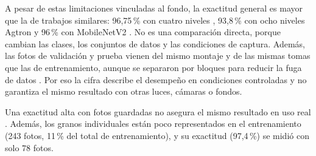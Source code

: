 A pesar de estas limitaciones vinculadas al fondo, la exactitud general es mayor que la de trabajos similares: 96,75\,\% con cuatro niveles \citep{marzuki2025}, 93,8\,\% con ocho niveles Agtron \citep{anto2025} y 96\,\% con MobileNetV2 \citep{arsyan2026}. No es una comparación directa, porque cambian las clases, los conjuntos de datos y las condiciones de captura. Además, las fotos de validación y prueba vienen del mismo montaje y de las mismas tomas que las de entrenamiento, aunque se separaron por bloques para reducir la fuga de datos \citep{kapoor2022}. Por eso la cifra describe el desempeño en condiciones controladas y no garantiza el mismo resultado con otras luces, cámaras o fondos.

Una exactitud alta con fotos guardadas no asegura el mismo resultado en uso real \citep{geirhos2020}. Además, los granos individuales están poco representados en el entrenamiento (243 fotos, 11\,\% del total de entrenamiento), y su exactitud (97,4\,\%) se midió con solo 78 fotos.
